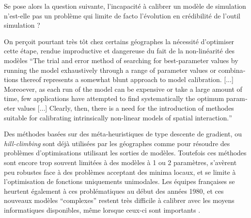 Se pose alors la question suivante, l'incapacité à calibrer un modèle de simulation n'est-elle pas un problème qui limite de facto l'évolution en crédibilité de l'outil simulation ? 

On perçoit pourtant très tôt chez certains géographes la nécessité d'optimiser cette étape, rendue improductive et dangereuse du fait de la non-linéarité des modèles \foreignquote{english}{The trial and error method of searching for best-parameter values by running the model exhaustively through a range of parameter values or combinations thereof represents a somewhat blunt approach to model calibration. [...] Moreoever, as each run of the model can be expensive or take a large amount of time, few applications have attempted to find systematically the optimum parameter values [...] Clearly, then, there is a need for the introduction of methodes suitable for calibrating intrinsically non-linear models of spatial interaction.} \autocite[155]{Batty1976}

Des méthodes basées sur des méta-heuristiques de type descente de gradient, ou \textit{hill-climbing} sont déjà utilisées par les géographes comme \textcite[159-160]{Batty1976} pour résoudre des problèmes d'optimisations utilisant les sorties de modèles. Toutefois ces méthodes sont encore trop souvent limitées à des modèles à 1 ou 2 paramètres, s'avèrent peu robustes face à des problèmes acceptant des minima locaux, et se limite à l'optimisation de fonctions uniquements unimodales. Les équipes françaises se heurtent également à ces problématiques au début des années 1980, et ces nouveaux modèles \enquote{complexes} restent très difficile à calibrer avec les moyens informatiques disponibles, même lorsque ceux-ci sont importants \autocites{Pumain1983b, Sanders1984}.

